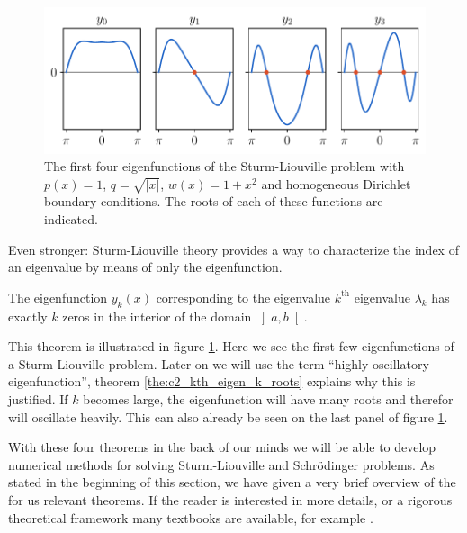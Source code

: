 \begin{figure}
    \begin{center}
        \includegraphics[width=\textwidth]{img/chapter2/slp_count_roots.pdf}
    \end{center}
    \caption{The first four eigenfunctions of the Sturm-Liouville problem with $p(x) = 1$, $q = \sqrt{|x|}$, $w(x) = 1+x^2$ and homogeneous Dirichlet boundary conditions. The roots of each of these functions are indicated.}
    \label{fig:c2_sturm_liovuille_k_roots}
\end{figure}

Even stronger: Sturm-Liouville theory provides a way to characterize the index of an eigenvalue by means of only the eigenfunction.

\begin{theorem}\label{the:c2_kth_eigen_k_roots}
    The eigenfunction $y_k(x)$ corresponding to the eigenvalue $k^{\text{th}}$ eigenvalue $\lambda_k$ has exactly $k$ zeros in the interior of the domain $\left]a, b\right[$.
\end{theorem}

This theorem is illustrated in figure \ref{fig:c2_sturm_liovuille_k_roots}. Here we see the first few eigenfunctions of a Sturm-Liouville problem. Later on we will use the term ``highly oscillatory eigenfunction'', theorem \ref{the:c2_kth_eigen_k_roots} explains why this is justified. If $k$ becomes large, the eigenfunction will have many roots and therefor will oscillate heavily. This can also already be seen on the last panel of figure \ref{fig:c2_sturm_liovuille_k_roots}.

With these four theorems in the back of our minds we will be able to develop numerical methods for solving Sturm-Liouville and Schrödinger problems. As stated in the beginning of this section, we have given a very brief overview of the for us relevant theorems. If the reader is interested in more details, or a rigorous theoretical framework many textbooks are available, for example \cite{sagan_boundary_1961,al-gwaiz_sturmliouville_2008,zettl_sturmliouville_2012,guenther_sturmliouville_2018}.

